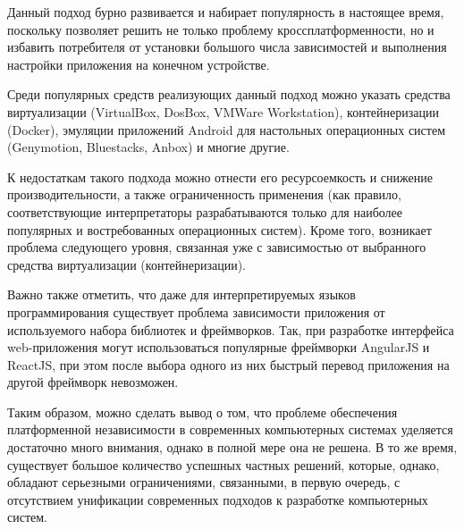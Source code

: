 \begin{textitemize}
	Данный подход бурно развивается и набирает популярность в настоящее время, поскольку позволяет решить не только проблему кроссплатформенности, но и избавить потребителя от установки большого числа зависимостей и выполнения настройки приложения на конечном устройстве.
	
	Среди популярных средств реализующих данный подход можно указать средства виртуализации (VirtualBox, DosBox, VMWare Workstation), контейнеризации (Docker), эмуляции приложений Android для настольных операционных систем (Genymotion, Bluestacks, Anbox) и многие другие.
	
	К недостаткам такого подхода можно отнести его ресурсоемкость и снижение производительности, а также ограниченность применения (как правило, соответствующие интерпретаторы разрабатываются только для наиболее популярных и востребованных операционных систем). Кроме того, возникает проблема следующего уровня, связанная уже с зависимостью от выбранного средства виртуализации (контейнеризации).
\end{textitemize}

Важно также отметить, что даже для интерпретируемых языков программирования существует проблема зависимости приложения от используемого набора библиотек и фреймворков. Так, при разработке интерфейса web-приложения могут использоваться популярные фреймворки AngularJS и ReactJS, при этом после выбора одного из них быстрый перевод приложения на другой фреймворк невозможен.

Таким образом, можно сделать вывод о том, что проблеме обеспечения платформенной независимости в современных компьютерных системах уделяется достаточно много внимания, однако в полной мере она не решена. В то же время, существует большое количество успешных частных решений, которые, однако, обладают серьезными ограничениями, связанными, в первую очередь, с отсутствием унификации современных подходов к разработке компьютерных систем. 

